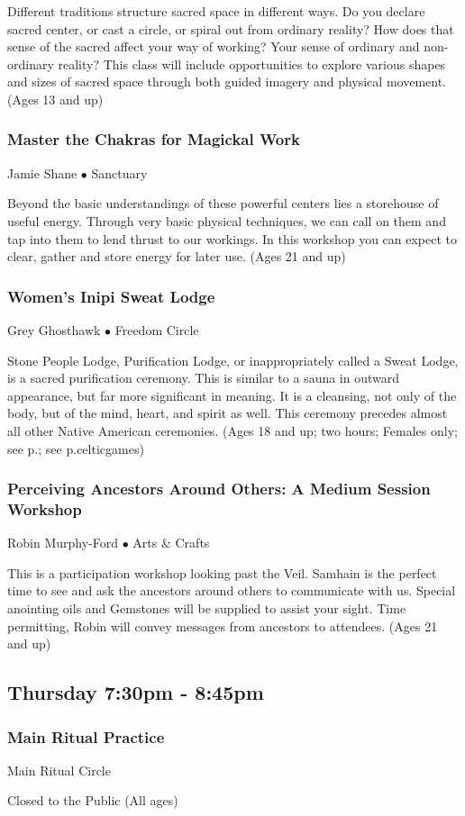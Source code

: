  Different traditions structure sacred space in different ways. Do you declare sacred center, or cast a circle, or spiral out from ordinary reality? How does that sense of the sacred affect your way of working? Your sense of ordinary and non-ordinary reality? This class will include opportunities to explore various shapes and sizes of sacred space through both guided imagery and physical movement.  {\small (Ages 13 and up)}

\subsubsection{Master the Chakras for  Magickal Work}
\label{Thu-Shane1}
{\small Jamie Shane $\bullet$  Sanctuary}

 Beyond the basic understandings of these powerful centers lies a storehouse of useful energy. Through very basic physical techniques, we can call on them and tap into them to lend thrust to our workings. In this workshop you can expect to clear, gather and store energy for later use.  {\small (Ages 21 and up)}

\subsubsection{Women's Inipi Sweat Lodge}
\label{Thu-sweat-women}
{\small Grey Ghosthawk $\bullet$  Freedom Circle}

 Stone People Lodge, Purification Lodge, or inappropriately called a Sweat Lodge, is a sacred purification ceremony. This is similar to a sauna in outward appearance, but far more significant in meaning. It is a cleansing, not only of the body, but of the mind, heart, and spirit as well. This ceremony precedes almost all other Native American ceremonies. {\small (Ages 18 and up; two hours; Females only; see p.\pageref{sweatlodge}; see p.{celticgames})}

\subsubsection{Perceiving Ancestors Around Others:  A Medium Session Workshop}
\label{Thu-Ford2}
{\small Robin Murphy-Ford $\bullet$  Arts \& Crafts}

 This is a participation workshop looking past the Veil.  Samhain is the perfect time to see and ask the ancestors around others to communicate with us.  Special anointing oils and Gemstones will be supplied to assist your sight. Time permitting, Robin will convey messages from ancestors to attendees.  {\small (Ages 21 and up)}

\subsection{Thursday 7:30pm - 8:45pm}

\subsubsection{Main Ritual Practice}
\label{Thu-Prac1}
{\small  Main Ritual Circle}

 Closed to the Public {\small (All ages)}